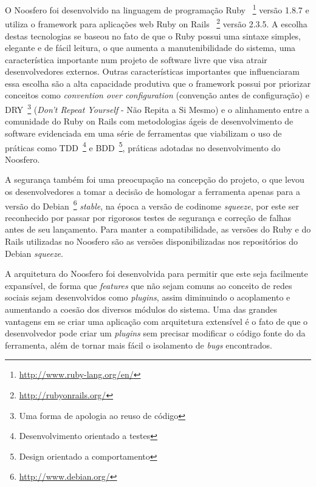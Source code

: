 
O Noosfero foi desenvolvido na linguagem de programação Ruby
~\footnote{\url{http://www.ruby-lang.org/en/}}
versão 1.8.7 e utiliza o framework para aplicações web Ruby on Rails
~\footnote{\url{http://rubyonrails.org/}}
versão 2.3.5.
%
A escolha destas tecnologias se baseou no fato de que o Ruby possui uma sintaxe
simples, elegante e de fácil leitura, o que aumenta a manutenibilidade do sistema,
uma característica importante num projeto de software livre que visa atrair
desenvolvedores externos. 
%
Outras características importantes que influenciaram essa escolha são a alta
capacidade produtiva que o framework possui por priorizar conceitos como
\textit{convention over configuration} (convenção antes de configuração)
e DRY~\footnote{Uma forma de apologia ao reuso de código}
(\textit{Don't Repeat Yourself} - Não Repita a Si Mesmo)
e o alinhamento entre a comunidade do Ruby on Rails com metodologias ágeis de
desenvolvimento de software evidenciada em uma série de ferramentas que
viabilizam o uso de práticas como TDD~\footnote{Desenvolvimento orientado a testes}
e BDD~\footnote{Design orientado a comportamento}, práticas adotadas no
desenvolvimento do Noosfero.


A segurança também foi uma preocupação na concepção do projeto, o que levou os
desenvolvedores a tomar a decisão de homologar a ferramenta apenas para a
versão do Debian~\footnote{\url{http://www.debian.org/}}
\textit{stable}, na época a versão de codinome \textit{squeeze}, por este
ser reconhecido por passar por rigorosos testes de segurança e correção de
falhas antes de seu lançamento. 
%
Para manter a compatibilidade, as versões do Ruby e do Rails utilizadas no
Noosfero são as versões disponibilizadas nos repositórios do Debian
\textit{squeeze}.

A arquitetura do Noosfero foi desenvolvida para permitir que este seja facilmente
expansível, de forma que \textit{features} que não sejam comuns ao conceito de
redes sociais sejam desenvolvidos como \textit{plugins}, assim diminuindo
o acoplamento e aumentando a coesão dos diversos módulos do sistema.
%
Uma das grandes vantagens em se criar uma aplicação com arquitetura extensível
é o fato de que o desenvolvedor pode criar um \textit{plugins}
sem precisar modificar o código fonte do da ferramenta, além de tornar mais
fácil o isolamento de \textit{bugs} encontrados. 

